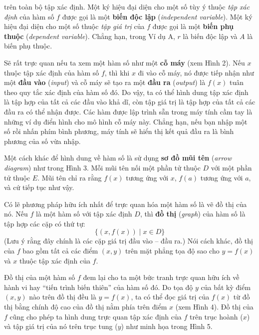 \begin{minipage}[t]{0.705\textwidth}
    \noindent
    trên toàn bộ tập xác định. Một ký hiệu đại diện cho một số tùy ý thuộc \textit{tập xác định} của hàm số $f$ được gọi là một \textbf{biến độc lập} (\textit{independent variable}). Một ký hiệu đại diện cho một số thuộc \textit{tập giá trị} của $f$ được gọi là một \textbf{biến phụ thuộc} (\textit{dependent variable}). Chẳng hạn, trong Ví dụ A, $r$ là biến độc lập và $A$ là biến phụ thuộc.

    Sẽ rất trực quan nếu ta xem một hàm số như một \textbf{cỗ máy} (xem Hình 2). Nếu $x$ thuộc tập xác định của hàm số $f$, thì khi $x$ đi vào cỗ máy, nó được tiếp nhận như một \textbf{đầu vào} (\textit{input}) và cỗ máy sẽ tạo ra một \textbf{đầu ra} (\textit{output}) là $f(x)$ tuân theo quy tắc xác định của hàm số đó. Do vậy, ta có thể hình dung tập xác định là tập hợp của tất cả các đầu vào khả dĩ, còn tập giá trị là tập hợp của tất cả các đầu ra có thể nhận được. Các hàm được lập trình sẵn trong máy tính cầm tay là những ví dụ điển hình cho mô hình cỗ máy này. Chẳng hạn, nếu bạn nhập một số rồi nhấn phím bình phương, máy tính sẽ hiển thị kết quả đầu ra là bình phương của số vừa nhập.

    Một cách khác để hình dung về hàm số là sử dụng \textbf{sơ đồ mũi tên} (\textit{arrow diagram}) như trong Hình 3. Mỗi mũi tên nối một phần tử thuộc $D$ với một phần tử thuộc $E$. Mũi tên chỉ ra rằng $f(x)$ tương ứng với $x$, $f(a)$ tương ứng với $a$, và cứ tiếp tục như vậy.

    Có lẽ phương pháp hữu ích nhất để trực quan hóa một hàm số là vẽ đồ thị của nó. Nếu $f$ là một hàm số với tập xác định $D$, thì \textbf{đồ thị} (\textit{graph}) của hàm số là tập hợp các cặp có thứ tự:
    \[
    \{ (x, f(x)) \mid x \in D \}
    \]
    (Lưu ý rằng đây chính là các cặp giá trị đầu vào -- đầu ra.) Nói cách khác, đồ thị của $f$ bao gồm tất cả các điểm $(x, y)$ trên mặt phẳng tọa độ sao cho $y = f(x)$ và $x$ thuộc tập xác định của $f$.

    Đồ thị của một hàm số $f$ đem lại cho ta một bức tranh trực quan hữu ích về hành vi hay ``tiến trình biến thiên'' của hàm số đó. Do tọa độ $y$ của bất kỳ điểm $(x, y)$ nào trên đồ thị đều là $y = f(x)$, ta có thể đọc giá trị của $f(x)$ từ đồ thị bằng chính độ cao của đồ thị nằm phía trên điểm $x$ (xem Hình 4). Đồ thị của $f$ cũng cho phép ta hình dung trực quan tập xác định của $f$ trên trục hoành ($x$) và tập giá trị của nó trên trục tung ($y$) như minh họa trong Hình 5.


\end{minipage}
